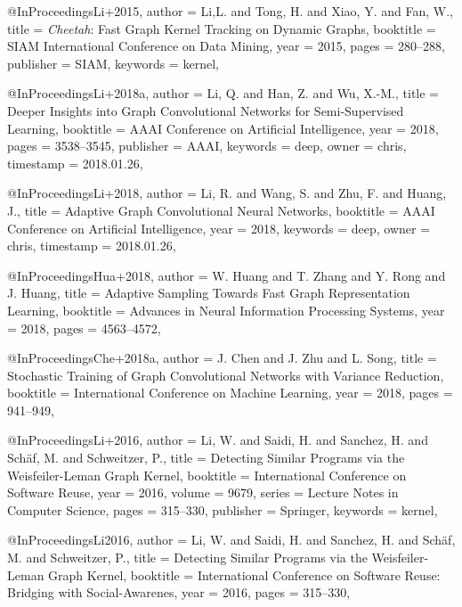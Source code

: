 @InProceedings{Li+2015,
  author    = {Li,L. and Tong, H. and Xiao, Y. and Fan, W.},
  title     = {\emph{Cheetah}: Fast Graph Kernel Tracking on Dynamic Graphs},
  booktitle = {SIAM International Conference on Data Mining},
  year      = {2015},
  pages     = {280--288},
  publisher = {SIAM},
  keywords  = {kernel},
}

@InProceedings{Li+2018a,
  author    = {Li, Q. and Han, Z. and Wu, X.-M.},
  title     = {Deeper Insights into Graph Convolutional Networks for Semi-Supervised Learning},
  booktitle = {AAAI Conference on Artificial Intelligence},
  year      = {2018},
  pages     = {3538--3545},
  publisher = {AAAI},
  keywords  = {deep},
  owner     = {chris},
  timestamp = {2018.01.26},
}

@InProceedings{Li+2018,
  author    = {Li, R. and Wang, S. and Zhu, F. and Huang, J.},
  title     = {Adaptive Graph Convolutional Neural Networks},
  booktitle = {AAAI Conference on Artificial Intelligence},
  year      = {2018},
  keywords  = {deep},
  owner     = {chris},
  timestamp = {2018.01.26},
}

@InProceedings{Hua+2018,
  author    = {W. Huang and T. Zhang and Y. Rong and J. Huang},
  title     = {Adaptive Sampling Towards Fast Graph Representation Learning},
  booktitle = {Advances in Neural Information Processing Systems},
  year      = {2018},
  pages     = {4563--4572},
}

@InProceedings{Che+2018a,
  author    = {J. Chen and J. Zhu and L. Song},
  title     = {Stochastic Training of Graph Convolutional Networks with Variance Reduction},
  booktitle = {International Conference on Machine Learning},
  year      = {2018},
  pages     = {941--949},
}

@InProceedings{Li+2016,
  author    = {Li, W. and Saidi, H. and Sanchez, H. and Sch{\"{a}}f, M. and Schweitzer, P.},
  title     = {Detecting Similar Programs via the {W}eisfeiler-{L}eman Graph Kernel},
  booktitle = {International Conference on Software Reuse},
  year      = {2016},
  volume    = {9679},
  series    = {Lecture Notes in Computer Science},
  pages     = {315--330},
  publisher = {Springer},
  keywords  = {kernel},
}

@InProceedings{Li2016,
  author    = {Li, W. and Saidi, H. and Sanchez, H. and Sch{\"{a}}f, M. and Schweitzer, P.},
  title     = {Detecting Similar Programs via the {Weisfeiler-Leman} Graph Kernel},
  booktitle = {International Conference on Software Reuse: {B}ridging with Social-Awarenes},
  year      = {2016},
  pages     = {315--330},
}

